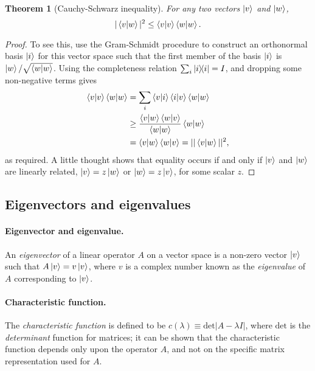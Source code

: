 \documentclass{article}
\newtheorem{theorem}{Theorem}
\begin{document}
\begin{theorem}[Cauchy-Schwarz inequality]
  For any two vectors $\ket{v}$ and $\ket{w}$, \begin{equation} \label{eq:cau-sch-ine}
    |\braket{v}{w}|^2 \leq \braket{v}{v}\braket{w}{w}.
  \end{equation}
\end{theorem}
\begin{proof}
  To see this, use the Gram-Schmidt procedure to construct an orthonormal basis $\ket{i}$ for this vector space such that the first member of the basis $\ket{i}$ is $\ket{w}/\sqrt{\braket{w}{w}}$. Using the completeness relation $\sum_i \ketbra{i}{i} = I$, and dropping some non-negative terms gives \begin{align*}
    \braket{v}{v}\braket{w}{w} &= \sum_i \braket{v}{i}\braket{i}{v}\braket{w}{w} \\
      &\geq \frac{\braket{v}{w}\braket{w}{v}}{\braket{w}{w}} \braket{w}{w} \\
      &= \braket{v}{w}\braket{w}{v} = ||\braket{v}{w}||^2,
  \end{align*} as required. A little thought shows that equality occurs if and only if $\ket{v}$ and $\ket{w}$ are linearly related, $\ket{v} = z\ket{w}$ or $\ket{w} = z\ket{v}$, for some scalar $z$.
\end{proof}

\subsection{Eigenvectors and eigenvalues}

\paragraph{Eigenvector and eigenvalue.} An \emph{eigenvector} of a linear operator $A$ on a vector space is a non-zero vector $\ket{v}$ such that $A\ket{v} = v\ket{v}$, where $v$ is a complex number known as the \emph{eigenvalue} of $A$ corresponding to $\ket{v}$.

\paragraph{Characteristic function.} The \emph{characteristic function} is defined to be $c(\lambda) \equiv \text{det} |A - \lambda I|$, where $\text{det}$ is the \emph{determinant} function for matrices; it can be shown that the characteristic function depends only upon the operator $A$, and not on the specific matrix representation used for $A$.
\end{document}

